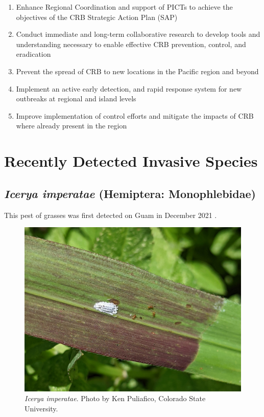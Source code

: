 \documentclass[twocolumn]{scrartcl}
\begin{document}
\begin{enumerate}
	\item Enhance Regional Coordination and support of PICTs to achieve the
	objectives of the CRB Strategic Action Plan (SAP)
	\item Conduct immediate and long-term collaborative research to develop
	tools and understanding necessary to enable effective CRB prevention, control, and
	eradication
	\item Prevent the spread of CRB to new locations in the Pacific region and
	beyond
	\item Implement an active early detection, and rapid response system for new
	outbreaks at regional and island levels
	\item Improve implementation of control efforts and mitigate the impacts of
	CRB where already present in the region
	
\end{enumerate} 

\section{Recently Detected Invasive Species}

\subsection{\textit{Icerya imperatae} (Hemiptera: Monophlebidae)}

This pest of grasses was first detected on Guam in December 2021 \cite{moore2021}.

\begin{figure}[H]
	\centering
	\includegraphics[width=\linewidth]{images/icerya}
	\caption{\textit{Icerya imperatae}. Photo by Ken Puliafico, Colorado State University.}
	\label{fig:icerya}
\end{figure}
\end{document}
